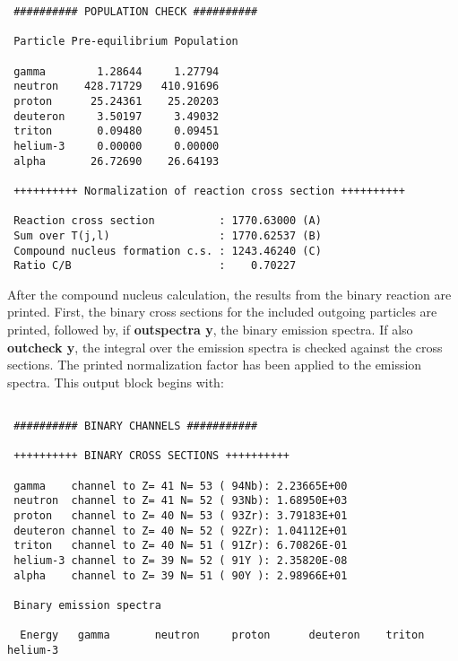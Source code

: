 \begin{samplecase}
{\begin{verbatim}
 ########## POPULATION CHECK ##########

 Particle Pre-equilibrium Population
  
 gamma        1.28644     1.27794
 neutron    428.71729   410.91696
 proton      25.24361    25.20203
 deuteron     3.50197     3.49032 
 triton       0.09480     0.09451
 helium-3     0.00000     0.00000
 alpha       26.72690    26.64193

 ++++++++++ Normalization of reaction cross section ++++++++++
   
 Reaction cross section          : 1770.63000 (A)
 Sum over T(j,l)                 : 1770.62537 (B)
 Compound nucleus formation c.s. : 1243.46240 (C)
 Ratio C/B                       :    0.70227
\end{verbatim} } \renewcommand{\baselinestretch}{1.07}\small\normalsize
\noindent
After the compound nucleus 
calculation, the results from the binary reaction are printed. First, the 
binary cross sections for the included outgoing particles are printed, 
followed by, if {\bf outspectra y}, the binary emission spectra. If also 
{\bf outcheck y}, the integral over the emission spectra is checked against the 
cross sections. The printed normalization factor has
been applied to the emission spectra. This output block begins with:

{\small \begin{verbatim}

 ########## BINARY CHANNELS ###########

 ++++++++++ BINARY CROSS SECTIONS ++++++++++

 gamma    channel to Z= 41 N= 53 ( 94Nb): 2.23665E+00
 neutron  channel to Z= 41 N= 52 ( 93Nb): 1.68950E+03
 proton   channel to Z= 40 N= 53 ( 93Zr): 3.79183E+01
 deuteron channel to Z= 40 N= 52 ( 92Zr): 1.04112E+01
 triton   channel to Z= 40 N= 51 ( 91Zr): 6.70826E-01
 helium-3 channel to Z= 39 N= 52 ( 91Y ): 2.35820E-08
 alpha    channel to Z= 39 N= 51 ( 90Y ): 2.98966E+01

 Binary emission spectra

  Energy   gamma       neutron     proton      deuteron    triton      helium-3 


\end{verbatim}}
\end{samplecase}
